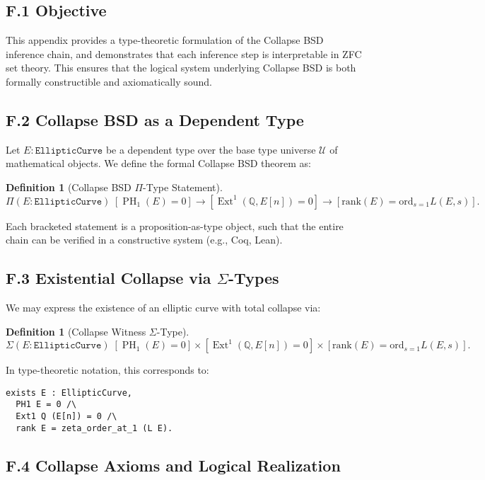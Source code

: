 \documentclass[11pt]{article}
\newtheorem{definition}[theorem]{Definition}
\DeclareMathOperator{\Ext}{Ext}
\DeclareMathOperator{\PH}{PH}
\newcommand{\QQ}{\mathbb{Q}}
\begin{document}
\subsection*{F.1 Objective}

This appendix provides a type-theoretic formulation of the Collapse BSD inference chain, and demonstrates that each inference step is interpretable in ZFC set theory.  
This ensures that the logical system underlying Collapse BSD is both formally constructible and axiomatically sound.

\subsection*{F.2 Collapse BSD as a Dependent Type}

Let $E : \texttt{EllipticCurve}$ be a dependent type over the base type universe $\mathcal{U}$ of mathematical objects.  
We define the formal Collapse BSD theorem as:

\begin{definition}[Collapse BSD $\Pi$-Type Statement]
\[
\Pi (E : \texttt{EllipticCurve})\; 
[\PH_1(E) = 0] \to [\Ext^1(\QQ,E[n]) = 0] \to [\mathrm{rank}(E) = \mathrm{ord}_{s=1} L(E,s)].
\]
\end{definition}

Each bracketed statement is a proposition-as-type object, such that the entire chain can be verified in a constructive system (e.g., Coq, Lean).

\subsection*{F.3 Existential Collapse via $\Sigma$-Types}

We may express the existence of an elliptic curve with total collapse via:

\begin{definition}[Collapse Witness $\Sigma$-Type]
\[
\Sigma (E : \texttt{EllipticCurve})\;
[\PH_1(E) = 0] \times [\Ext^1(\QQ,E[n]) = 0] \times 
[\mathrm{rank}(E) = \mathrm{ord}_{s=1} L(E,s)].
\]
\end{definition}

In type-theoretic notation, this corresponds to:

\begin{lstlisting}
exists E : EllipticCurve,
  PH1 E = 0 /\
  Ext1 Q (E[n]) = 0 /\
  rank E = zeta_order_at_1 (L E).
\end{lstlisting}

\subsection*{F.4 Collapse Axioms and Logical Realization}
\end{document}

